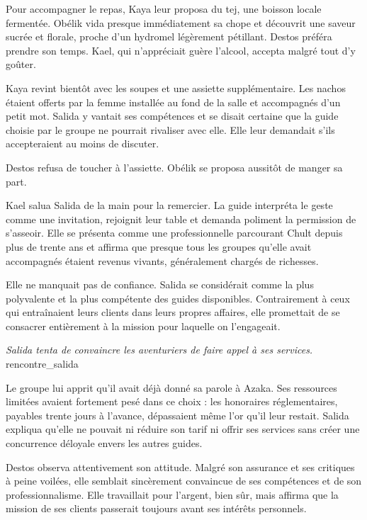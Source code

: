 Pour accompagner le repas, Kaya leur proposa du tej, une boisson locale fermentée. Obélik vida presque immédiatement sa chope et découvrit une saveur sucrée et florale, proche d'un hydromel légèrement pétillant. Destos préféra prendre son temps. Kael, qui n'appréciait guère l'alcool, accepta malgré tout d'y goûter.

Kaya revint bientôt avec les soupes et une assiette supplémentaire. Les nachos étaient offerts par la femme installée au fond de la salle et accompagnés d'un petit mot. Salida y vantait ses compétences et se disait certaine que la guide choisie par le groupe ne pourrait rivaliser avec elle. Elle leur demandait s'ils accepteraient au moins de discuter.

Destos refusa de toucher à l'assiette. Obélik se proposa aussitôt de manger sa part.

Kael salua Salida de la main pour la remercier. La guide interpréta le geste comme une invitation, rejoignit leur table et demanda poliment la permission de s'asseoir. Elle se présenta comme une professionnelle parcourant Chult depuis plus de trente ans et affirma que presque tous les groupes qu'elle avait accompagnés étaient revenus vivants, généralement chargés de richesses.

Elle ne manquait pas de confiance. Salida se considérait comme la plus polyvalente et la plus compétente des guides disponibles. Contrairement à ceux qui entraînaient leurs clients dans leurs propres affaires, elle promettait de se consacrer entièrement à la mission pour laquelle on l'engageait.

{\textit{Salida tenta de convaincre les aventuriers de faire appel à ses services.}}
{rencontre_salida}

Le groupe lui apprit qu'il avait déjà donné sa parole à Azaka. Ses ressources limitées avaient fortement pesé dans ce choix : les honoraires réglementaires, payables trente jours à l'avance, dépassaient même l'or qu'il leur restait. Salida expliqua qu'elle ne pouvait ni réduire son tarif ni offrir ses services sans créer une concurrence déloyale envers les autres guides.

Destos observa attentivement son attitude. Malgré son assurance et ses critiques à peine voilées, elle semblait sincèrement convaincue de ses compétences et de son professionnalisme. Elle travaillait pour l'argent, bien sûr, mais affirma que la mission de ses clients passerait toujours avant ses intérêts personnels.

